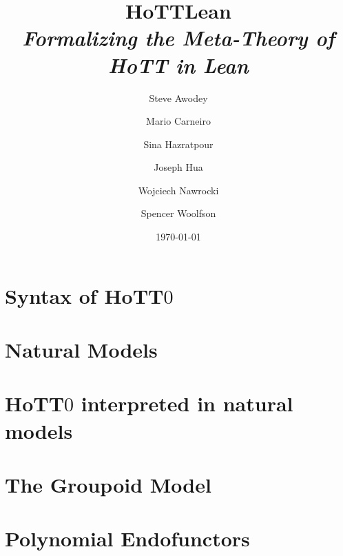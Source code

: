 
\title{HoTTLean\\
 { \it Formalizing the Meta-Theory of HoTT in Lean} }
\author{Steve Awodey \and Mario Carneiro \and Sina Hazratpour \and Joseph Hua \and
  Wojciech Nawrocki \and Spencer Woolfson}
\date{\today}


\maketitle

\chapter{Syntax of HoTT$0$}

\chapter{Natural Models}

\chapter{HoTT$0$ interpreted in natural models}

\chapter{The Groupoid Model}

\chapter{Polynomial Endofunctors}


{}



